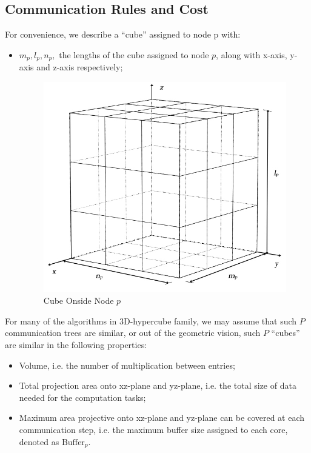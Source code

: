 \documentclass{amsart}
\theoremstyle{definition}
\theoremstyle{remark}
\numberwithin{equation}{section}
\begin{document}
\subsection{Communication Rules and Cost}
For convenience, we describe a “cube” assigned to node p with:\par
\begin{itemize}
\item $m_p,l_p,n_p,$ the lengths of the cube assigned to node $p$, along with x-axis, y-axis and z-axis respectively;
\begin{figure}[h]
	\includegraphics[scale=0.45]{Figures/cube.jpg}
	\caption{Cube Onside Node $p$}
\end{figure}
\end{itemize}

	For many of the algorithms in 3D-hypercube family, we may assume that such $P$ communication trees are similar, or out of the geometric vision, such $P$ “cubes” are similar in the following properties:\par
\begin{itemize}
\item Volume, i.e. the number of multiplication between entries;
\item Total projection area onto xz-plane and yz-plane, i.e. the total size of data needed for the computation tasks;
\item Maximum area projective onto xz-plane and yz-plane can be covered at each communication step, i.e. the maximum buffer size assigned to each core, denoted as $\text{Buffer}_p$.
\end{itemize}
\end{document}
